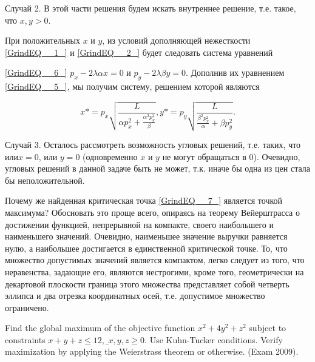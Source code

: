 \begin{solution}
Случай 2. В этой части решения будем искать внутреннее решение, т.е. такое, что $x,y>0$.

При положительных $x$ и $y$, из условий дополняющей нежесткости \eqref{GrindEQ__1_} и \eqref{GrindEQ__2_} будет следовать система уравнений

\eqref{GrindEQ__6_}  $p_{x} -2\lambda \alpha x=0$ и $p_{y} -2\lambda \beta y=0$. Дополнив их уравнением \eqref{GrindEQ__5_}, мы получим систему, решением которой являются 

\begin{equation} \label{GrindEQ__7_} x*=p_{x} \sqrt{\frac{L}{\alpha p_{x}^{2} +\frac{\alpha ^{2} p_{y}^{2} }{\beta } } } , y*=p_{y} \sqrt{\frac{L}{\frac{\beta ^{2} p_{x}^{2} }{\alpha } +\beta p_{y}^{2} } } . \end{equation} 

Случай 3. Осталось рассмотреть возможность угловых решений, т.е. таких, что или$x=0$, или $y=0$ (одновременно $x$ и $y$ не могут обращаться в 0). Очевидно, угловых решений в данной задаче быть не может, т.к. иначе бы одна из цен стала бы неположительной.

Почему же найденная критическая точка \eqref{GrindEQ__7_} является точкой максимума? Обосновать это проще всего, опираясь на теорему Вейерштрасса о достижении функцией, непрерывной на компакте, своего наибольшего и наименьшего значений. Очевидно, наименьшее значение выручки равняется нулю, а наибольшее достигается в единственной критической точке. То, что множество допустимых значений является компактом, легко следует из того, что неравенства, задающие его, являются нестрогими, кроме того, геометрически на декартовой плоскости граница этого множества представляет собой четверть эллипса и два отрезка координатных осей, т.е. допустимое множество ограничено.
\end{solution}


\begin{problem}
Find the global maximum of the objective function $x^{2} +4y^{2} +z^{2} $ subject to constraints $x+y+z\le 12,\_ x,y,z\ge 0$. Use Kuhn-Tucker conditions. Verify maximization by applying the Weierstrass theorem or otherwise. (Exam 2009).
\end{problem}

